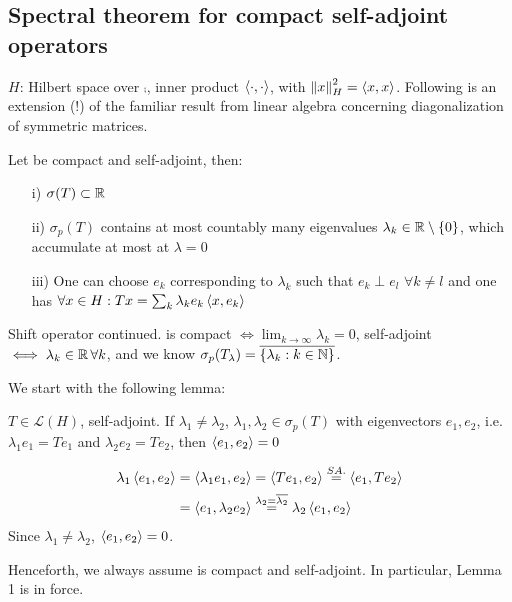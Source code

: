 \subsection{Spectral theorem for compact self-adjoint operators}
$H$: Hilbert space over $\comp$, inner product $\left<{\cdot},{\cdot}\right>$, with $\left\|{x}\right\|^2_H=\left<{x},{x}\right>$. Following is an extension (!) of the familiar result from linear algebra concerning diagonalization of symmetric matrices.
\begin{theorem}\nl
	Let   be compact and self-adjoint, then:
	\begin{itemize}
		\item [i)] $\sigma(T)\subset\mathbb{R}$
		\item [ii)] $\sigma_p(T)$ contains at most countably many eigenvalues $\lambda_k\in\mathbb{R}\setminus\{0\}$, which accumulate at most at $\lambda=0$
		\item [iii)] One can choose $e_k$  corresponding to $\lambda_k$ such that $e_k\perp e_l$ $\forall k\neq l$ and one has $\forall x\in H:Tx=\sum_k \lambda_k e_k\left<{x},{e_k}\right>$
	\end{itemize}
\end{theorem}
\begin{example}\nl
	Shift operator  continued. is compact $\iff \lim_{k\to\infty}\lambda_k=0$, self-adjoint $\iff \lambda_k\in\mathbb{R}\,\forall k$, and we know $\sigma_p(T_\lambda)=\overline{\{\lambda_k:k\in\mathbb{N}\}}$.
\end{example}
We start with the following lemma:
\begin{lemma}[Lemma 1]
	$T\in\mathcal{L}(H)$, self-adjoint. If $\lambda_1\neq\lambda_2$, $\lambda_1,\lambda_2\in\sigma_p(T)$ with eigenvectors $e_1,e_2$, i.e. $\lambda_1 e_1=Te_1$ and $\lambda_2e_2=Te_2$, then $\left<{e_1},{e_2}\right>=0$
	\begin{pf}{}{}
		\begin{equation}
			\begin{split}
				\lambda_1\left<{e_1},{e_2}\right>&=\left<{\lambda_1e_1},{e_2}\right>=\left<{Te_1},{e_2}\right>\stackrel{SA.}{=}\left<{e_1},{Te_2}\right>\\
				&=\left<{e_1},{\lambda_2e_2}\right>\stackrel{\lambda_2=\overline{\lambda_2}}{=}\lambda_2\left<{e_1},{e_2}\right>
			\end{split}
		\end{equation}
		Since $\lambda_1\neq\lambda_2$, $\left<{e_1},{e_2}\right>=0$.
	\end{pf}
\end{lemma}
Henceforth, we always assume  is compact and self-adjoint. In particular, Lemma 1 is in force.\\
